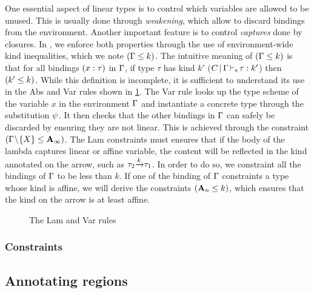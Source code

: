One essential aspect of linear types is to control which variables
are allowed to be unused. This is usually done through \emph{weakening},
which allow to discard bindings from the environment.
Another important feature is to control \emph{captures} done by closures.
In \lang, we enforce both properties through the use of environment-wide
kind inequalities, which we note $\Cleq{\E}{k}$.
The intuitive meaning of $\Cleq{\E}{k}$ is that for all bindings
$\bvar{x}{\tau}$ in $\E$,
if type $\tau$ has kind $k'$ ($\inferSK{C}{\E}{\tau}{k'}$)
then $\Cleq{k'}{k}$.
While this definition is incomplete, it is sufficient to understand
its use in the {\sc Abs} and {\sc Var} rules shown in \cref{selectrules:binders}.
%
The {\sc Var} rule looks up the type scheme of the variable $x$ in
the environment $\E$
and instantiate a concrete type through the substitution $\unif$. It then
checks that the other bindings in $\E$ can safely be discarded by
ensuring they are not linear. This is achieved through the constraint
$\Cleq{\E\Sdel{X}}{\kaff_\infty}$.
%
The {\sc Lam} constraints must ensures that if the body of the lambda captures
linear or affine variable, the content will be reflected in the kind
annotated on the arrow, such as $\tau_2 \tarr{k} \tau_1$.
In order to do so, we constraint all the bindings of $\E$ to be less than $k$.
If one of the binding of $\E$ constraints a type whose kind is affine,
we will derive the constraints $\Cleq{\kaff_n}{k}$, which ensures that
the kind on the arrow is at least affine.

\begin{figure}[!h]
  \centering
  \begin{mathpar}
    
  \end{mathpar}
  \caption{The {\sc Lam} and {\sc Var} rules}
  \label{selectrules:binders}
\end{figure}



\subsubsection{Constraints}




\clearpage

\subsection{Annotating regions}
\label{regionannot}

